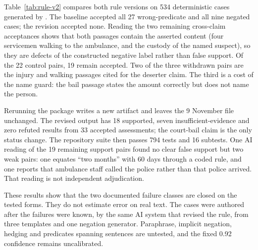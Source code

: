 Table~\ref{tab:rule-v2} compares both rule versions on 534 deterministic cases generated by . The baseline accepted all 27 wrong-predicate and all nine negated cases; the revision accepted none. Reading the two remaining cross-claim acceptances shows that both passages contain the asserted content (four servicemen walking to the ambulance, and the custody of the named suspect), so they are defects of the constructed negative label rather than false support. Of the 22 control pairs, 19 remain accepted. Two of the three withdrawn pairs are the injury and walking passages cited for the deserter claim. The third is a cost of the name guard: the bail passage states the amount correctly but does not name the person.

Rerunning the package writes a new artifact and leaves the 9 November file unchanged. The revised output has 18 supported, seven insufficient-evidence and zero refuted results from 33 accepted assessments; the court-bail claim is the only status change. The repository suite then passes 794 tests and 16 subtests. One AI reading of the 19 remaining support pairs found no clear false support but two weak pairs: one equates ``two months'' with 60 days through a coded rule, and one reports that ambulance staff called the police rather than that police arrived. That reading is not independent adjudication.

These results show that the two documented failure classes are closed on the tested forms. They do not estimate error on real text. The cases were authored after the failures were known, by the same AI system that revised the rule, from three templates and one negation generator. Paraphrase, implicit negation, hedging and predicates spanning sentences are untested, and the fixed 0.92 confidence remains uncalibrated.

